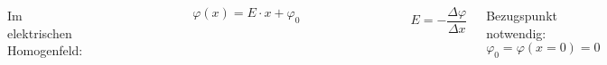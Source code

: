 \begin{frame}
{\begin{columns}
	


	   Im elektrischen Homogenfeld: 

	   \begin{figure}[ht]
		\centering
		

	\end{figure}

	

		
		\begin{equation*}
			\varphi(x) = E \cdot x + \varphi_0
		\end{equation*}
	


		\pause

		\begin{figure}[ht]
			\centering
			

	
		\end{figure}



		\begin{equation*}
			E = - \frac{\Delta \varphi}{\Delta x}
		 \end{equation*}


		
	\vspace{5pt}
		Bezugspunkt notwendig:
		\vspace{-5pt}
		\begin{equation*}
			\varphi_0 = \varphi(x=0) =0 
		\end{equation*}
	\end{columns}	

}
\end{frame}
